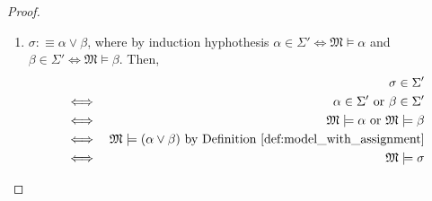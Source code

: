 \documentclass[11pt,letterpaper]{book}
\theoremstyle{definition}
\begin{document}
\begin{enumerate}
\begin{proof}
\begin{enumerate}
{}

\item{$\sigma : \equiv \alpha \lor \beta$, where by induction
hyphothesis  $\alpha \in \Sigma' \iff \mathfrak{M} \models \alpha $ and
$\beta \in \Sigma' \iff \mathfrak{M} \models \beta $. Then,
\begin{eqnarray*}
& & \sigma \in \Sigma' \\
& \iff & \alpha \in \Sigma' \text{ or } \beta \in \Sigma' \\
& \iff & \mathfrak{M} \models \alpha \text{ or } \mathfrak{M} \models
\beta \\
& \iff & \mathfrak{M} \models (\alpha \lor \beta) \text{ by Definition
\ref{def:model_with_assignment}} \\
& \iff & \mathfrak{M} \models \sigma
\end{eqnarray*}
}


\end{enumerate}
\end{proof}
\end{enumerate}
\end{document}
